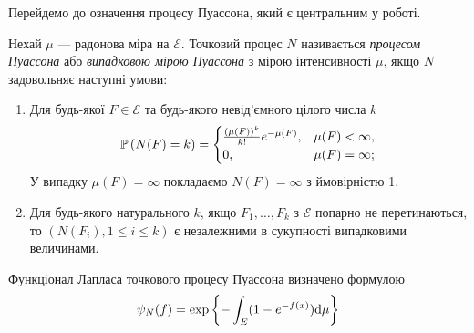 Перейдемо до означення процесу Пуассона, який є центральним у роботі.
\begin{definition}\label{def:poiss_proc}
    Нехай $\mu$ --- радонова міра на $\mathcal{E}$.
    Точковий процес $N$ називається \emph{процесом Пуассона} або
    \emph{випадковою мірою Пуассона} з мірою інтенсивності $\mu$, якщо $N$ 
    задовольняє наступні умови:
    \begin{enumerate}
        \item Для будь-якої $F \in \mathcal{E}$ 
        та будь-якого невід'ємного цілого числа $k$
        \begin{gather*}
            \P{N(F) = k} = \begin{cases}
                \frac{(\mu(F))^k}{k!} e^{-\mu(F)}, & \mu(F) < \infty, \\
                0, & \mu(F) = \infty;
            \end{cases}
        \end{gather*}
        У випадку $\mu(F) = \infty$ покладаємо $N(F) = \infty$ з ймовірністю 1.
        \item Для будь-якого натурального $k$, 
        якщо $F_1, \dots, F_k$ з $\mathcal{E}$ попарно не перетинаються, то
        $\left(N(F_i), 1\leq i \leq k\right)$ є незалежними в сукупності випадковими величинами.
    \end{enumerate}
    Функціонал Лапласа точкового процесу Пуассона визначено формулою
    \begin{gather}
        \psi_N(f) = \exp\left\{ 
            - \int_E (1 - e^{-f(x)}) \d \mu
        \right\}
    \end{gather}
\end{definition}

